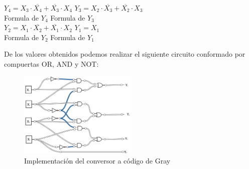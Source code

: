 \begin{center}
\begin{figure}[H]
    \label{fig:Karnaughs_GRAY} 
\end{figure}	
   	$Y_4=X_3 \cdot \overline{X_4}+\overline{X_3} \cdot X_4$
   	\hspace{6mm}
   	$Y_3=X_2 \cdot \overline{X_3}+\overline{X_2} \cdot X_3$\\
   	Formula de $Y_4$
   	\hspace{6mm}
   	Formula de $Y_3$\\
    $Y_2=X_1 \cdot \overline{X_2}+\overline{X_1} \cdot X_2$
    \hspace{10mm}
    $Y_1=X_1$\\
    Formula de $Y_2$
    \hspace{18mm}
    Formula de $Y_1$\\
\end{center}
De los valores obtenidos podemos realizar el siguiente circuito conformado por compuertas OR, AND y NOT:\\
\begin{figure}[H]
	\centering
    \includegraphics[width=0.5\textwidth]{Ejercicio_4/Circuito}
    \caption{Implementación del conversor a código de Gray}
\end{figure}
